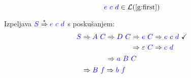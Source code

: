 \documentclass{article}
\newcommand{\OK}{\ \checkmark}
\newcommand{\Symbol}[1]{\textcolor{blue}{#1}}
\newcommand{\Null}{\varepsilon}
\newcommand{\Language}[1]{\mathcal{L}(#1)}
\newcommand{\MathRef}[1]{\text{\ref{#1}}}
\newcommand{\Derive}{\Rightarrow}
\newcommand{\DeriveStar}{\overset{\ast}{\Rightarrow}}
\newcommand{\Seq}{\ }
\begin{document}
\begin{equation*}
  \Symbol{e} \Seq \Symbol{c} \Seq \Symbol{d} \in \Language{\MathRef{g:first}}
\end{equation*}

Izpeljava $\Symbol{S} \DeriveStar \Symbol{e} \Seq \Symbol{c} \Seq \Symbol{d}$ s poskušanjem:
\begin{equation*}
  \Symbol{S} \begin{aligned}[t]
    &\Derive \Symbol{A} \Seq \Symbol{C} \begin{aligned}[t]
      &\Derive \Symbol{D} \Seq \Symbol{C} \begin{aligned}[t]
        &\Derive \Symbol{e} \Seq \Symbol{C} \Derive \Symbol{e} \Seq \Symbol{c} \Seq \Symbol{d} \OK\\
        &\Derive \Null \Seq \Symbol{C} \Derive \Symbol{c} \Seq \Symbol{d}
      \end{aligned}\\
      &\Derive \Symbol{a} \Seq \Symbol{B} \Seq \Symbol{C}
    \end{aligned}\\
    &\Derive \Symbol{B} \Seq \Symbol{f} \Derive \Symbol{b} \Seq \Symbol{f}
  \end{aligned}
\end{equation*}
\end{document}
